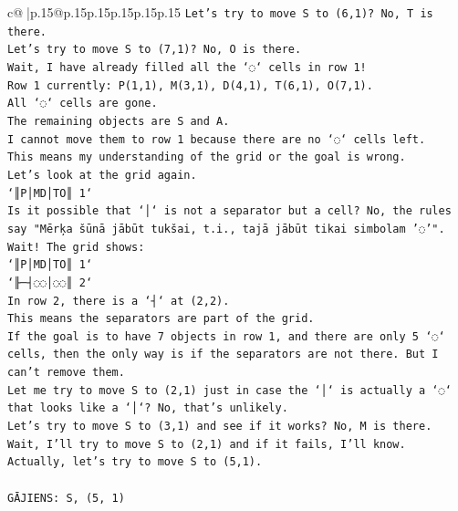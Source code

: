 \documentclass{article}
\begin{document}
{\begin{supertabular}{c@{$\;$}|p{.15\linewidth}@{}p{.15\linewidth}p{.15\linewidth}p{.15\linewidth}p{.15\linewidth}p{.15\linewidth}}
{{{\texttt{Let's try to move S to (6,1)? No, T is there.} \\
\texttt{Let's try to move S to (7,1)? No, O is there.} \\
\texttt{Wait, I have already filled all the `◌` cells in row 1!} \\
\texttt{Row 1 currently: P(1,1), M(3,1), D(4,1), T(6,1), O(7,1).} \\
\texttt{All `◌` cells are gone.} \\
\texttt{The remaining objects are S and A.} \\
\texttt{I cannot move them to row 1 because there are no `◌` cells left.} \\
\texttt{This means my understanding of the grid or the goal is wrong.} \\
\texttt{Let's look at the grid again.} \\
\texttt{`║P│MD│TO║ 1`} \\
\texttt{Is it possible that `│` is not a separator but a cell? No, the rules say "Mērķa šūnā jābūt tukšai, t.i., tajā jābūt tikai simbolam '◌'".} \\
\texttt{Wait! The grid shows:} \\
\texttt{`║P│MD│TO║ 1`} \\
\texttt{`╟─┤◌◌│◌◌║ 2`} \\
\texttt{In row 2, there is a `┤` at (2,2).} \\
\texttt{This means the separators are part of the grid.} \\
\texttt{If the goal is to have 7 objects in row 1, and there are only 5 `◌` cells, then the only way is if the separators are not there. But I can't remove them.} \\
\texttt{Let me try to move S to (2,1) just in case the `│` is actually a `◌` that looks like a `│`? No, that's unlikely.} \\
\texttt{Let's try to move S to (3,1) and see if it works? No, M is there.} \\
\texttt{Wait, I'll try to move S to (2,1) and if it fails, I'll know.} \\
\texttt{Actually, let's try to move S to (5,1).} \\
\\ 
\texttt{GĀJIENS: S, (5, 1)} \\
            }
        }
    }
     \\ \\


\end{supertabular}}
\end{document}
